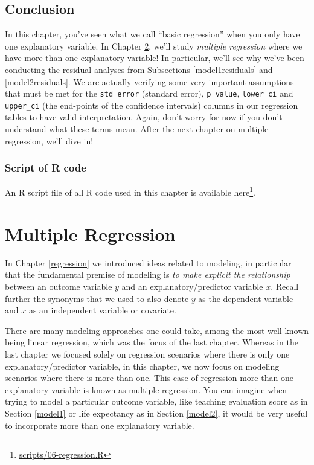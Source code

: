 \documentclass[12pt,]{krantz}
\renewcommand{\href}[2]{#2\footnote{\url{#1}}}
\theoremstyle{definition}
\theoremstyle{definition}
\theoremstyle{definition}
\theoremstyle{remark}
\begin{document}
\section{Conclusion}\label{conclusion-4}

In this chapter, you've seen what we call ``basic regression'' when you
only have one explanatory variable. In Chapter
\ref{multiple-regression}, we'll study \emph{multiple regression} where
we have more than one explanatory variable! In particular, we'll see why
we've been conducting the residual analyses from Subsections
\ref{model1residuals} and \ref{model2residuals}. We are actually
verifying some very important assumptions that must be met for the
\texttt{std\_error} (standard error), \texttt{p\_value},
\texttt{lower\_ci} and \texttt{upper\_ci} (the end-points of the
confidence intervals) columns in our regression tables to have valid
interpretation. Again, don't worry for now if you don't understand what
these terms mean. After the next chapter on multiple regression, we'll
dive in!

\subsection{Script of R code}\label{script-of-r-code-3}

An R script file of all R code used in this chapter is available
\href{scripts/06-regression.R}{here}.

\chapter{Multiple Regression}\label{multiple-regression}

In Chapter \ref{regression} we introduced ideas related to modeling, in
particular that the fundamental premise of modeling is \emph{to make
explicit the relationship} between an outcome variable \(y\) and an
explanatory/predictor variable \(x\). Recall further the synonyms that
we used to also denote \(y\) as the dependent variable and \(x\) as an
independent variable or covariate.

There are many modeling approaches one could take, among the most
well-known being linear regression, which was the focus of the last
chapter. Whereas in the last chapter we focused solely on regression
scenarios where there is only one explanatory/predictor variable, in
this chapter, we now focus on modeling scenarios where there is more
than one. This case of regression more than one explanatory variable is
known as multiple regression. You can imagine when trying to model a
particular outcome variable, like teaching evaluation score as in
Section \ref{model1} or life expectancy as in Section \ref{model2}, it
would be very useful to incorporate more than one explanatory variable.
\end{document}
